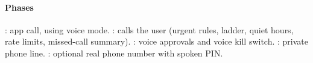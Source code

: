 \paragraph{Phases} : app call, using voice mode. : \hivi{} calls the user (urgent rules, ladder, quiet hours, rate limits, missed-call summary). : voice approvals and voice kill switch. : private phone line. : optional real phone number with spoken PIN.
